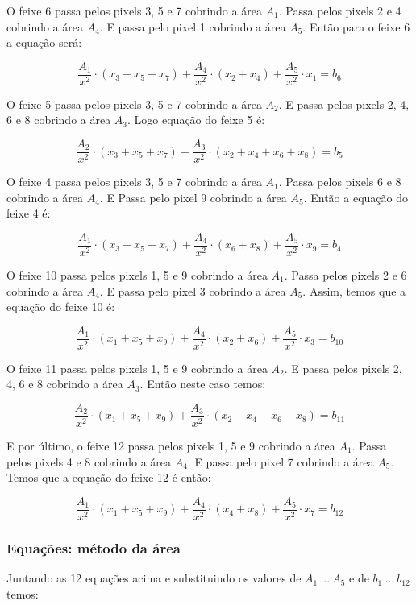 \documentclass[a4paper, 12pt]{article}
\begin{document}
O feixe 6 passa pelos pixels 3, 5 e 7 cobrindo a área $A_1$. Passa pelos pixels 2 e 4 cobrindo a área $A_4$. E passa pelo pixel 1 cobrindo a área $A_5$. Então para o feixe 6 a equação será:

$$\frac{A_1}{x^2}\cdot \left(x_3+x_5+x_7\right)+\frac{A_4}{x^2}\cdot \left(x_2+x_4\right)+\frac{A_5}{x^2}\cdot x_1=b_6$$

O feixe 5 passa pelos pixels 3, 5 e 7 cobrindo a área $A_2$. E passa pelos pixels 2, 4, 6 e 8 cobrindo a área $A_3$. Logo equação do feixe 5 é: 

$$\frac{A_2}{x^2}\cdot \left(x_3+x_5+x_7\right)+\frac{A_3}{x^2}\cdot \left(x_2+x_4+x_6+x_8\right)=b_5$$

O feixe 4 passa pelos pixels 3, 5 e 7 cobrindo a área $A_1$. Passa pelos pixels 6 e 8 cobrindo a área $A_4$. E Passa pelo pixel 9 cobrindo a área $A_5$. Então a equação do feixe 4 é:

$$\frac{A_1}{x^2}\cdot \left(x_3+x_5+x_7\right)+\frac{A_4}{x^2}\cdot \left(x_6+x_8\right)+\frac{A_5}{x^2}\cdot x_9=b_4$$

O feixe 10 passa pelos pixels 1, 5 e 9 cobrindo a área $A_1$. Passa pelos pixels 2 e 6 cobrindo a área $A_4$. E passa pelo pixel 3 cobrindo a área $A_5$. Assim, temos que a equação do feixe 10 é:

$$\frac{A_1}{x^2}\cdot \left(x_1+x_5+x_9\right)+\frac{A_4}{x^2}\cdot \left(x_2+x_6\right)+\frac{A_5}{x^2}\cdot x_3=b_{10}$$

O feixe 11 passa pelos pixels 1, 5 e 9 cobrindo a área $A_2$. E passa pelos pixels 2, 4, 6 e 8 cobrindo a área $A_3$. Então neste caso temos:

$$\frac{A_2}{x^2}\cdot \left(x_1+x_5+x_9\right)+\frac{A_3}{x^2}\cdot \left(x_2+x_4+x_6+x_8\right)=b_{11}$$

E por último, o feixe 12 passa pelos pixels 1, 5 e 9 cobrindo a área $A_1$. Passa pelos pixels 4 e 8 cobrindo a área $A_4$. E passa pelo pixel 7 cobrindo a área $A_5$. Temos que a equação do feixe 12 é então:

$$\frac{A_1}{x^2}\cdot \left(x_1+x_5+x_9\right)+\frac{A_4}{x^2}\cdot \left(x_4+x_8\right)+\frac{A_5}{x^2}\cdot x_7=b_{12}$$

\subsubsection{Equações: método da área}
Juntando as 12 equações acima e substituindo os valores de $A_1\ ...\ A_5$ e de $b_1\ ...\ b_{12}$ temos:
\end{document}
